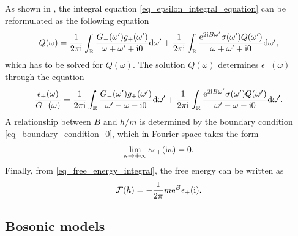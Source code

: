 \documentclass[a4paper,11pt]{article}
\theoremstyle{definition}
\newcommand{\re}{{\rm e}}
\newcommand{\ri}{{\rm i}}
\newcommand{\rd}{{\rm d}}
\begin{document}
As shown in \cite{hmn,fnw1}, the integral equation \eqref{eq_epsilon_integral_equation} can be 
reformulated as the following equation
%
\begin{equation}
Q(\omega) = \frac{1}{2 \pi \ri} 
\int_\mathbb{R} \frac{G_-(\omega') g_+(\omega')}{\omega+ \omega'+ \ri 0} \rd \omega' 
+ \frac{1}{2 \pi \ri} \int_\mathbb{R} \frac{\re^{2 \ri B\omega'} \sigma (\omega') Q(\omega')}{\omega+ \omega'+ \ri 0} \rd \omega',
\label{eq_Q_integral_equation}
\end{equation}
%
which has to be solved for $Q(\omega)$. The solution $Q(\omega)$ determines 
$\epsilon_+(\omega)$ through the equation
%
\begin{equation}
\frac{\epsilon_+(\omega)}{G_+(\omega)} = \frac{1}{2 \pi \ri} 
\int_\mathbb{R} \frac{G_-(\omega') g_+(\omega')}{\omega'-\omega- \ri 0} \rd \omega'+ 
\frac{1}{2 \pi \ri} \int_\mathbb{R} \frac{\re^{2 \ri B\omega'} \sigma (\omega')Q(\omega')}{\omega'- \omega- \ri 0} \rd \omega'.
\label{eq_epsilon_0}
\end{equation}
%
A relationship between $B$ and $h/m$ is determined by the boundary 
condition \eqref{eq_boundary_condition_0}, which in Fourier space takes the form
%
\begin{equation}
\lim_{\kappa \to +\infty} \kappa \epsilon_+(\ri \kappa)=0.
\label{eq_boundary_condition}
\end{equation}
%
Finally, from \eqref{eq_free_energy_integral}, the free energy can be written as
%
\begin{equation}
\mathcal{F}(h)= -{1\over 2 \pi} m \re^B \epsilon_+(\ri). 
\label{eq_free_energy_fourier}
\end{equation}

\subsection{Bosonic models}
\end{document}
